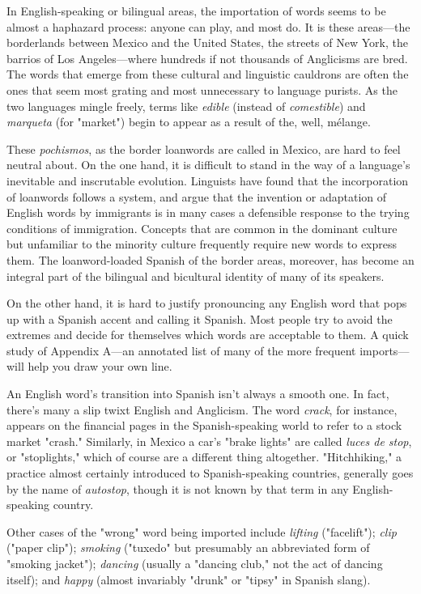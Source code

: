 In English-speaking or bilingual areas, the importation of
words seems to be almost a haphazard process: anyone can play, and
most do. It is these areas---the borderlands between Mexico and the
United States, the streets of New York, the barrios of Los Angeles---where hundreds if not thousands of Anglicisms are bred. The words
that emerge from these cultural and linguistic cauldrons are often the
ones that seem most grating and most unnecessary to language purists.
As the two languages mingle freely, terms like \emph{edible} (instead of \emph{comestible}) and \emph{marqueta} (for "market") begin to appear as a result of
the, well, mélange.

These \emph{pochismos}, as the border loanwords are called in
Mexico, are hard to feel neutral about. On the one hand, it is difficult to
stand in the way of a language's inevitable and inscrutable evolution.
Linguists have found that the incorporation of loanwords follows a system, and argue that the invention or adaptation of English words by
immigrants is in many cases a defensible response to the trying conditions of immigration. Concepts that are common in the dominant culture but unfamiliar to the minority culture frequently require new
words to express them. The loanword-loaded Spanish of the border
areas, moreover, has become an integral part of the bilingual and bicultural identity of many of its speakers.

On the other hand, it is hard to justify pronouncing any English word that pops up with a Spanish accent and calling it Spanish.
Most people try to avoid the extremes and decide for themselves which
words are acceptable to them. A quick study of Appendix A---an annotated list of many of the more frequent imports---will help you draw
your own line.

An English word's transition into Spanish isn't always a
smooth one. In fact, there's many a slip twixt English and Anglicism.
The word \emph{crack}, for instance, appears on the financial pages in the
Spanish-speaking world to refer to a stock market "crash." Similarly,
in Mexico a car's "brake lights" are called \emph{luces de stop}, or "stoplights," which of course are a different thing altogether. "Hitchhiking,"
a practice almost certainly introduced to Spanish-speaking countries,
generally goes by the name of \emph{autostop}, though it is not known by that
term in any English-speaking country.

Other cases of the "wrong" word being imported include \emph{lifting} ("facelift"); \emph{clip} ("paper clip"); \emph{smoking} ("tuxedo" but presumably
an abbreviated form of "smoking jacket"); \emph{dancing} (usually a "dancing club," not the act of dancing itself); and \emph{happy} (almost invariably
"drunk" or "tipsy" in Spanish slang).

